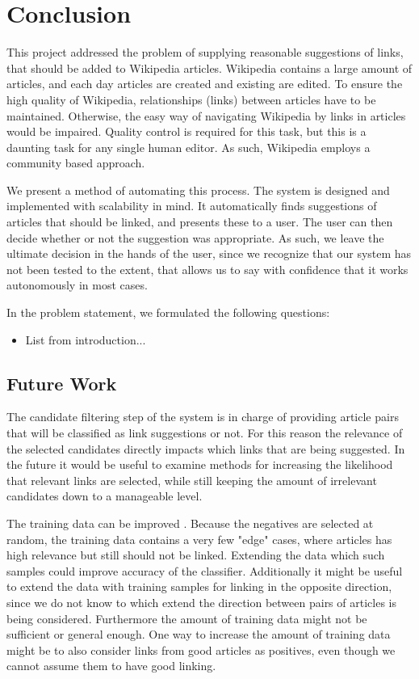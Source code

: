 \chapter{Conclusion}\label{chap:conclusion}
This project addressed the problem of supplying reasonable suggestions of links, that should be added to Wikipedia articles. Wikipedia contains a large amount of articles, and each day articles are created and existing are edited. To ensure the high quality of Wikipedia, relationships (links) between articles have to be maintained. Otherwise, the easy way of navigating Wikipedia by links in articles would be impaired. Quality control is required for this task, but this is a daunting task for any single human editor. As such, Wikipedia employs a community based approach. 

We present a method of automating this process. The system is designed and implemented with scalability in mind. It automatically finds suggestions of articles that should be linked, and presents these to a user. The user can then decide whether or not the suggestion was appropriate. As such, we leave the ultimate decision in the hands of the user, since we recognize that our system has not been tested to the extent, that allows us to say with confidence that it works autonomously in most cases.

In the problem statement, we formulated the following questions:
\begin{itemize}
	\item List from introduction...
\end{itemize}


\section{Future Work}
The candidate filtering step of the system is in charge of providing article pairs that will be classified as link suggestions or not. For this reason the relevance of the selected candidates directly impacts which links that are being suggested. In the future it would be useful to examine methods for increasing the likelihood that relevant links are selected, while still keeping the amount of irrelevant candidates down to a manageable level.

The training data can be improved . Because the negatives are selected at random, the training data contains a very few "edge" cases, where articles has high relevance but still should not be linked. Extending the data which such samples could improve accuracy of the classifier. Additionally it might be useful to extend the data with training samples for linking in the opposite direction, since we do not know to which extend the direction between pairs of articles is being considered.
Furthermore the amount of training data might not be sufficient or general enough. One way to increase the amount of training data might be to also consider links from good articles as positives, even though we cannot assume them to have good linking.

